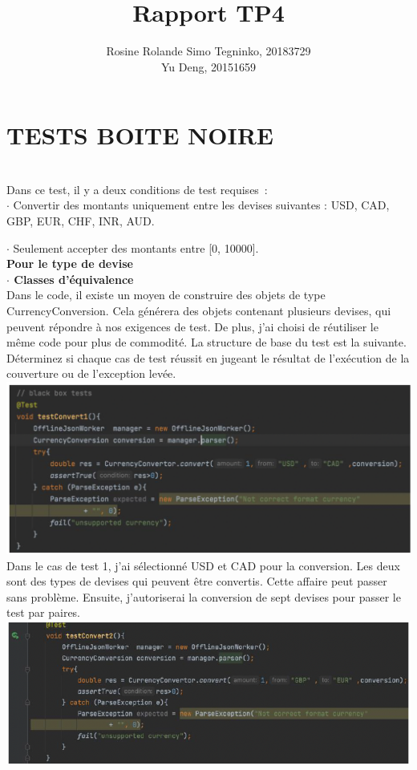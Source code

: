 \documentclass{article}
\title{Rapport TP4}
\author{Rosine Rolande Simo Tegninko, 20183729\\
Yu Deng, 20151659}
\date{}
\begin{document}
\maketitle

\section*{TESTS BOITE NOIRE}\\

Dans ce test, il y a deux conditions de test requises :\\

$\cdot$ Convertir des montants uniquement entre les devises suivantes : USD, CAD, GBP, EUR, CHF, INR, AUD.

$\cdot$ Seulement accepter des montants entre [0, 10000].\\

\textbf{Pour le type de devise}\\

\textbf{$\cdot$ Classes d'équivalence}\\


Dans le code, il existe un moyen de construire des objets de type CurrencyConversion. Cela générera des objets contenant plusieurs devises, qui peuvent répondre à nos exigences de test. De plus, j'ai choisi de réutiliser le même code pour plus de commodité. La structure de base du test est la suivante. Déterminez si chaque cas de test réussit en jugeant le résultat de l'exécution de la couverture ou de l'exception levée.\\
\includegraphics[scale=0.5]{G1.png}\\

Dans le cas de test 1, j'ai sélectionné USD et CAD pour la conversion. Les deux sont des types de devises qui peuvent être convertis. Cette affaire peut passer sans problème. Ensuite, j'autoriserai la conversion de sept devises pour passer le test par paires.\\
\includegraphics[scale=0.7]{G2.png}\\
\end{document}
